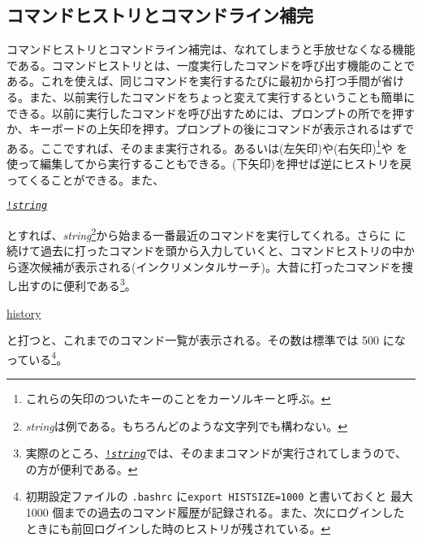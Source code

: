 \subsection{コマンドヒストリとコマンドライン補完}

コマンドヒストリとコマンドライン補完は、なれてしまうと手放せなくなる機能である。コマンドヒストリとは、一度実行したコマンドを呼び出す機能のことである。これを使えば、同じコマンドを実行するたびに最初から打つ手間が省ける。また、以前実行したコマンドをちょっと変えて実行するということも簡単にできる。以前に実行したコマンドを呼び出すためには、プロンプトの所でを押すか、キーボードの上矢印を押す。プロンプトの後にコマンドが表示されるはずである。ここで\ret すれば、そのまま実行される。あるいは(左矢印)や(右矢印)\footnote{これらの矢印のついたキーのことをカーソルキーと呼ぶ。}や \BS を使って編集してから実行することもできる。(下矢印)を押せば逆にヒストリを戻ってくることができる。また、
\begin{commandline2}
\prompt \underline{{\tt !{\it string}}}
\end{commandline2} \noindent
とすれば、{\it string}\footnote{{\it string}は例である。もちろんどのような文字列でも構わない。}から始まる一番最近のコマンドを実行してくれる。さらに に続けて過去に打ったコマンドを頭から入力していくと、コマンドヒストリの中から逐次候補が表示される(インクリメンタルサーチ)。大昔に打ったコマンドを捜し出すのに便利である\footnote{実際のところ、\underline{\tt !{\it string}}では、そのままコマンドが実行されてしまうので、の方が便利である。}。
\begin{commandline2}
\prompt \underline{history}
\end{commandline2} \noindent
と打つと、これまでのコマンド一覧が表示される。その数は標準では 500 になっている\footnote{初期設定ファイルの {\tt .bashrc} に{\tt export HISTSIZE=1000} と書いておくと  最大 1000 個までの過去のコマンド履歴が記録される。また、次にログインしたときにも前回ログインした時のヒストリが残されている。}。

